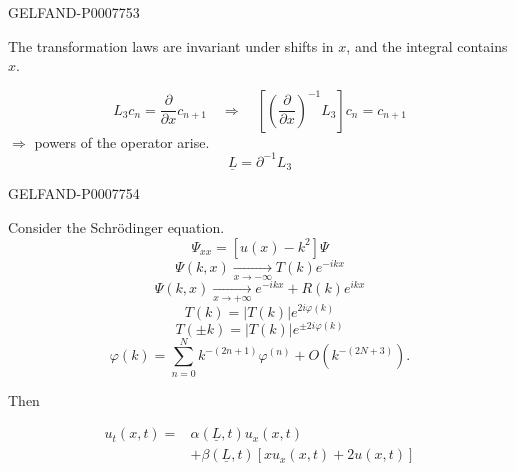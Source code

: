\begin{GelfandAdjacentEvidence}{GELFAND-P000775}{3}


The transformation laws are invariant under shifts in \(x\), and the integral contains \(x\).

\[
L_3c_n=\frac{\partial}{\partial x}c_{n+1}
\quad\Rightarrow\quad
\left[\left(\frac{\partial}{\partial x}\right)^{-1}L_3\right]c_n=c_{n+1}
\]
\(\Rightarrow\) powers of the operator arise.
\[
\underline L=\partial^{-1}L_3
\]
\end{GelfandAdjacentEvidence}
\begin{GelfandAdjacentEvidence}{GELFAND-P000775}{4}


Consider the Schrödinger equation.
\begin{equation}
\Psi_{xx}=[u(x)-k^2]\Psi\tag{6}
\end{equation}
\[
\Psi(k,x)\underset{x\to-\infty}{\longrightarrow}T(k)e^{-ikx}
\]
\[
\Psi(k,x)\underset{x\to+\infty}{\longrightarrow}e^{-ikx}+R(k)e^{ikx}
\]
\[
T(k)=|T(k)|e^{2i\varphi(k)}
\]
\[
T(\pm k)=|T(k)|e^{\pm2i\varphi(k)}
\]
\begin{equation}
\varphi(k)=\sum_{n=0}^N k^{-(2n+1)}\varphi^{(n)}+O(k^{-(2N+3)}).\tag{7}
\end{equation}

Then
\end{GelfandAdjacentEvidence}

\begin{equation}
\begin{split}
u_t(x,t)={}&\alpha(\underline L,t)u_x(x,t)\\
&+\beta(\underline L,t)[xu_x(x,t)+2u(x,t)]
\end{split}\tag{9}
\end{equation}


